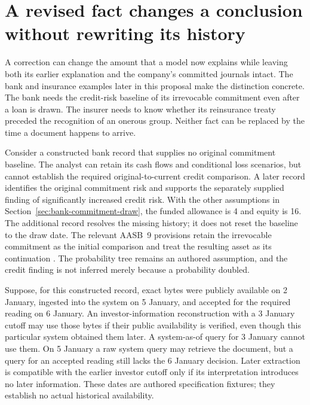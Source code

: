 \section{A revised fact changes a conclusion without rewriting its history}
\label{sec:sector-evidence-revision}

A correction can change the amount that a model now explains while leaving
both its earlier explanation and the company's committed journals intact.
The bank and insurance examples later in this proposal make the distinction
concrete. The bank needs the credit-risk baseline of its irrevocable
commitment even after a loan is drawn. The insurer needs to know whether
its reinsurance treaty preceded the recognition of an onerous group.
Neither fact can be replaced by the time a document happens to arrive.

Consider a constructed bank record that supplies no original commitment
baseline. The analyst can retain its cash flows and conditional loss
scenarios, but cannot establish the required original-to-current credit
comparison. A later record identifies the original commitment risk and
supports the separately supplied finding of significantly increased credit
risk. With the other assumptions in Section~\ref{sec:bank-commitment-draw},
the funded allowance is 4 and equity is 16. The additional record resolves
the missing history; it does not reset the baseline to the draw date.
The relevant AASB~9 provisions retain the irrevocable commitment as the
initial comparison and treat the resulting asset as its continuation
\citep[paragraph 5.5.6 and B5.5.47]{aasb9dated}.
The probability tree remains an authored assumption, and the credit finding
is not inferred merely because a probability doubled.

Suppose, for this constructed record, exact bytes were publicly available
on 2 January, ingested into the system on 5 January, and accepted for the
required reading on 6 January. An investor-information reconstruction with
a 3 January cutoff may use those bytes if their public availability is
verified, even though this particular system obtained them later. A
system-as-of query for 3 January cannot use them. On 5 January a raw
system query may retrieve the document, but a query for an accepted reading
still lacks the 6 January decision. Later extraction is compatible with
the earlier investor cutoff only if its interpretation introduces no later
information. These dates are authored specification fixtures; they
establish no actual historical availability.


